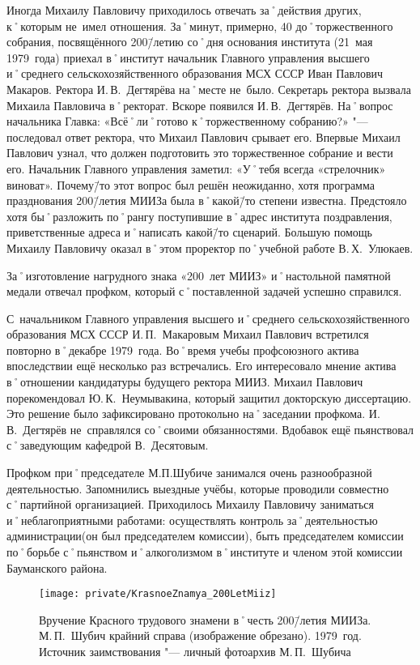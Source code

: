 Иногда Михаилу Павловичу приходилось отвечать за˚действия других, к˚которым не~имел отношения. За˚минут, примерно, 40 до˚торжественного собрания, посвящённого 200\=/летию со˚дня основания института (21~мая 1979~года) приехал в˚институт начальник Главного управления высшего и˚среднего сельскохозяйственного образования МСХ СССР Иван Павлович Макаров. Ректора И.\,В.~Дегтярёва на˚месте не~было. Секретарь ректора вызвала Михаила Павловича в˚ректорат. Вскоре появился И.\,В.~Дегтярёв. На˚вопрос начальника Главка: «Всё˚ли˚готово к˚торжественному собранию?» "--- последовал ответ ректора, что Михаил Павлович срывает его. Впервые Михаил Павлович узнал, что должен подготовить это торжественное собрание и вести его. Начальник Главного управления заметил: «У˚тебя всегда «стрелочник» виноват». Почему\=/то этот вопрос был решён неожиданно, хотя программа празднования 200\=/летия МИИЗа была в˚какой\=/то степени известна. Предстояло хотя бы˚разложить по˚рангу поступившие в˚адрес института поздравления, приветственные адреса и˚написать какой\=/то сценарий. Большую помощь Михаилу Павловичу оказал в˚этом проректор по˚учебной работе В.\,Х.~Улюкаев.

За˚изготовление нагрудного знака «200~лет МИИЗ» и˚настольной памятной медали отвечал профком, который с˚поставленной задачей успешно справился.

С~начальником Главного управления высшего и˚среднего сельскохозяйственного образования МСХ СССР И.\,П.~Макаровым Михаил Павлович встретился повторно в˚декабре 1979~года. Во˚время учебы профсоюзного актива впоследствии ещё несколько раз встречались. Его интересовало мнение актива в˚отношении кандидатуры будущего ректора МИИЗ. Михаил Павлович порекомендовал Ю.\,К.~Неумывакина, который защитил докторскую диссертацию. Это решение было зафиксировано протокольно на˚заседании профкома. И.\,В.~Дегтярёв не~справлялся со˚своими обязанностями. Вдобавок ещё пьянствовал с˚заведующим кафедрой В.~Десятовым.

Профком при˚председателе М.П.Шубиче занимался очень разнообразной деятельностью. Запомнились выездные учёбы, которые проводили совместно с˚партийной организацией. Приходилось Михаилу Павловичу заниматься и˚неблагоприятными работами: осуществлять контроль за˚деятельностью администрации(он был председателем комиссии), быть председателем комиссии по˚борьбе с˚пьянством и˚алкоголизмом в˚институте и членом этой комиссии Бауманского района.

\begin{figure}[h]
\texttt{[image: private/KrasnoeZnamya\_200LetMiiz]}
\caption[Вручение Красного трудового знамени в˚честь 200\=/летия МИИЗа. М.\,П.~Шубич крайний справа (изображение обрезано). 1979~год]{Вручение Красного трудового знамени в˚честь 200\=/летия МИИЗа. М.\,П.~Шубич крайний справа (изображение обрезано). 1979~год. Источник заимствования "--- личный фотоархив М.\,П.~Шубича}
\label{fig:KrasnoeZnamya_200LetMiiz}
\end{figure}

